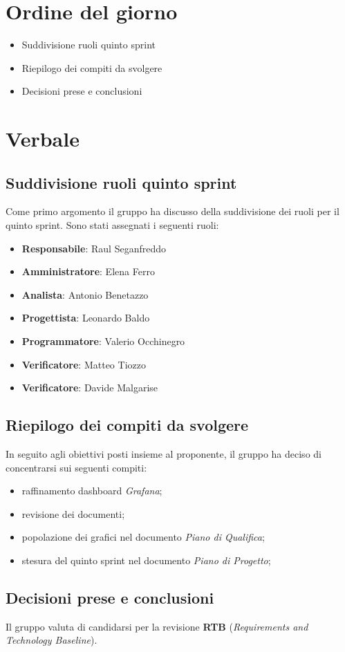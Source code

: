 \documentclass[italian,12pt]{article}
\begin{document}
\section{Ordine del giorno}

\begin{itemize}
	\item Suddivisione ruoli quinto sprint
	\item Riepilogo dei compiti da svolgere
	\item Decisioni prese e conclusioni
\end{itemize}


\newpage

\section{Verbale}

\subsection{Suddivisione ruoli quinto sprint}
Come primo argomento il gruppo ha discusso della suddivisione dei ruoli per il quinto sprint.
Sono stati assegnati i seguenti ruoli:
\begin{itemize}
	\item \textbf{Responsabile}: Raul Seganfreddo
	\item \textbf{Amministratore}: Elena Ferro
	\item \textbf{Analista}: Antonio Benetazzo
	\item \textbf{Progettista}: Leonardo Baldo
	\item \textbf{Programmatore}: Valerio Occhinegro
	\item \textbf{Verificatore}: Matteo Tiozzo
	\item \textbf{Verificatore}: Davide Malgarise
\end{itemize}

\subsection{Riepilogo dei compiti da svolgere}
In seguito agli obiettivi posti insieme al proponente, il gruppo ha deciso di concentrarsi sui seguenti compiti:
\begin{itemize}
	\item raffinamento dashboard \textit{Grafana};
	\item revisione dei documenti;
	\item popolazione dei grafici nel documento \textit{Piano di Qualifica};
	\item stesura del quinto sprint nel documento \textit{Piano di Progetto};
\end{itemize}

\subsection{Decisioni prese e conclusioni}
Il gruppo valuta di candidarsi per la revisione \textbf{RTB}
(\textit{Requirements and Technology Baseline}).
\end{document}
